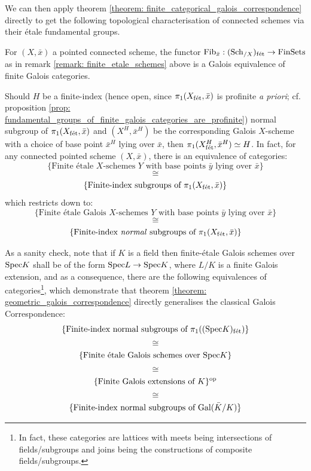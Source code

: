                 We can then apply theorem \ref{theorem: finite_categorical_galois_correspondence} directly to get the following topological characterisation of connected schemes via their \'etale fundamental groups.
                \begin{theorem} \label{theorem: geometric_galois_correspondence}
                    For $(X, \bar{x})$ a pointed connected scheme, the functor $\mathrm{Fib}_{\bar{x}}: (\mathrm{Sch}_{/X})_{\mathrm{f\acute{e}t}} \to \mathrm{Fin}\mathrm{Sets}$ as in remark \ref{remark: finite_etale_schemes} above is a Galois equivalence of finite Galois categories. 
                \end{theorem}
                \begin{corollary}
                    Should $H$ be a finite-index (hence open, since $\pi_1(X_{\mathrm{f\acute{e}t}}, \bar{x})$ is profinite \textit{a priori}; cf. proposition \ref{prop: fundamental_groups_of_finite_galois_categories_are_profinite}) normal subgroup of $\pi_1(X_{\mathrm{f\acute{e}t}}, \bar{x})$ and $(X^H, \bar{x}^H)$ be the corresponding Galois $X$-scheme with a choice of base point $\bar{x}^H$ lying over $\bar{x}$, then $\pi_1(X^H_{\mathrm{f\acute{e}t}}, \bar{x}^H) \simeq H$. In fact, for any connected pointed scheme $(X, \bar{x})$, there is an equivalence of categories:
                        $$\{\text{Finite \'etale $X$-schemes $Y$ with base points $\bar{y}$ lying over $\bar{x}$}\}$$
                        $$\cong$$
                        $$\{\text{Finite-index subgroups of $\pi_1(X_{\mathrm{f\acute{e}t}}, \bar{x})$}\}$$
                    which restricts down to:
                        $$\{\text{Finite \'etale Galois $X$-schemes $Y$ with base points $\bar{y}$ lying over $\bar{x}$}\}$$
                        $$\cong$$
                        $$\{\text{Finite-index \textit{normal} subgroups of $\pi_1(X_{\mathrm{f\acute{e}t}}, \bar{x})$}\}$$
                \end{corollary}
                \begin{example} \label{example: etale_fundamental_group_of_a_field}
                    As a sanity check, note that if $K$ is a field then finite-\'etale Galois schemes over $\mathrm{Spec} K$ shall be of the form $\mathrm{Spec} L \to \mathrm{Spec} K$, where $L/K$ is a finite Galois extension, and as a consequence, there are the following equivalences of categories\footnote{In fact, these categories are lattices with meets being intersections of fields/subgroups and joins being the constructions of composite fields/subgroups.}, which demonstrate that theorem \ref{theorem: geometric_galois_correspondence} directly generalises the classical Galois Correspondence:
                        $$\{\text{Finite-index normal subgroups of $\pi_1((\mathrm{Spec} K)_{\mathrm{f\acute{e}t}})$}\}$$
                        $$\cong$$
                        $$\{\text{Finite \'etale Galois schemes over $\mathrm{Spec} K$}\}$$
                        $$\cong$$
                        $$\{\text{Finite Galois extensions of $K$}\}^{\mathrm{op}}$$
                        $$\cong$$
                        $$\{\text{Finite-index normal subgroups of $\mathrm{Gal}(\bar{K}/K)$}\}$$
                \end{example}
